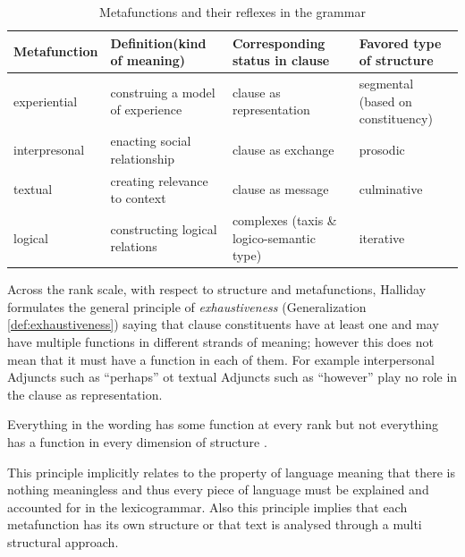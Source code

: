 \begin{table}[H]
	\centering
	\begin{tabulary}{\textwidth}{|l|L|L|L|}
		\hline
		{\bf Metafunction} & {\bf Definition(kind of meaning)} & {\bf Corresponding status in clause} & {\bf Favored type of structure}   \\ \hline
		experiential       & construing a model of experience  & clause as representation             & segmental (based on constituency) \\ \hline
		interpresonal      & enacting social relationship      & clause as exchange                   & prosodic                          \\ \hline
		textual            & creating relevance to context     & clause as message                    & culminative                       \\ \hline
		logical            & constructing logical relations    & complexes (taxis \& logico-semantic type) & iterative                         \\ \hline
	\end{tabulary}
	\caption{Metafunctions and their reflexes in the grammar}
	\label{tab:metafucntions}
\end{table}

Across the rank scale, with respect to structure and metafunctions, Halliday formulates the general principle of \textit{exhaustiveness} (Generalization \ref{def:exhaustiveness}) saying that clause constituents have at least one and may have multiple functions in different strands of meaning; however this does not mean that it must have a function in each of them. For example interpersonal Adjuncts such as ``perhaps'' ot textual Adjuncts such as ``however'' play no role in the clause as representation. 

\begin{generalization}\label{def:exhaustiveness}
    Everything in the wording has some function at every rank but not everything has a function in every dimension of structure \citep{Halliday2002,Halliday2013}.
\end{generalization}

This principle implicitly relates to the property of language meaning that 
there is nothing meaningless and thus every piece of language must be explained and accounted for in the lexicogrammar. Also this principle implies that each metafunction has its own structure or that text is analysed through a multi structural approach.

